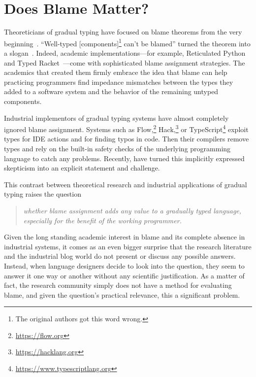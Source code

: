 \section{Does Blame Matter?} \label{sec:introduction}

Theoreticians of gradual typing have focused on
blame theorems from the very beginning~\cite{mf-toplas-2009, tf-dls-2006}. ``Well-typed
[components]\footnote{The original authors got this word wrong.} can't be
blamed'' turned the theorem into a slogan~\cite{wf-esop-2009}. Indeed,
academic implementations---for example, Reticulated
Python~\cite{vsc-dls-2019, vss-popl-2017, vksb-dls-2014} and Typed
Racket~\cite{tf-dls-2006,tf-popl-2008,tfffgksst-snapl-2017,tf-icfp-2010}---come
with sophisticated blame assignment strategies. The academics that
created them firmly embrace the idea that blame can help practicing
programmers find impedance mismatches between the types they added to a
software system and the behavior of the remaining untyped components. 

Industrial implementors of  gradual typing systems have almost completely ignored blame assignment.
Systems such as Flow,\footnote{\url{https://flow.org}}
Hack,\footnote{\url{https://hacklang.org}} or
TypeScript\footnote{\url{https://www.typescriptlang.org}} exploit types for IDE actions and for finding typos in
code. Then their compilers remove types and rely on the built-in safety checks of
the underlying programming language to catch any problems. 
Recently, \citet{cc-snapl-19} have turned this implicitly expressed
skepticism into an explicit statement and challenge.

This contrast between theoretical research and industrial applications of gradual typing raises the question 
\begin{quote}
 \it
 whether blame assignment adds any value to a gradually typed language, \\
 especially for the benefit of the working programmer.
\end{quote}
Given the long standing academic interest in blame  and its complete absence in
industrial systems, it comes as an even bigger surprise that the research
literature and the industrial blog world do not present or discuss any
possible answers.  Instead, when language designers decide to look into the
question, they seem to answer it one way or another without any scientific
justification. As a matter of fact, the research community simply does not have a
method for evaluating blame, and given the question's practical
relevance, this a significant problem.

